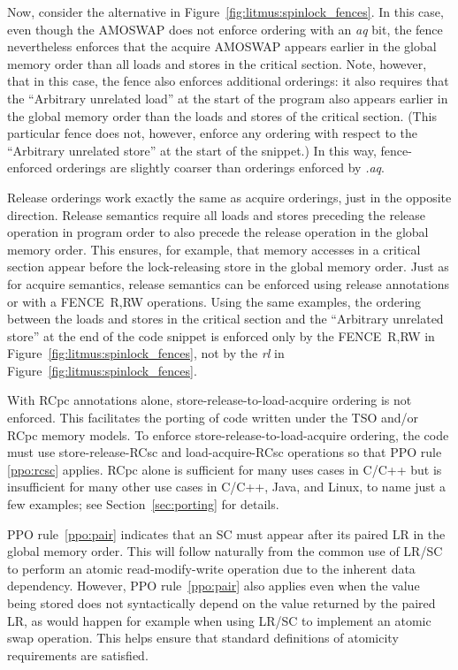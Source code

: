 Now, consider the alternative in Figure~\ref{fig:litmus:spinlock_fences}.
In this case, even though the AMOSWAP does not enforce ordering with an {\em aq} bit, the fence nevertheless enforces that the acquire AMOSWAP appears earlier in the global memory order than all loads and stores in the critical section.
Note, however, that in this case, the fence also enforces additional orderings: it also requires that the ``Arbitrary unrelated load'' at the start of the program also appears earlier in the global memory order than the loads and stores of the critical section.  (This particular fence does not, however, enforce any ordering with respect to the ``Arbitrary unrelated store'' at the start of the snippet.)
In this way, fence-enforced orderings are slightly coarser than orderings enforced by {\em .aq}.

Release orderings work exactly the same as acquire orderings, just in the opposite direction.  Release semantics require all loads and stores preceding the release operation in program order to also precede the release operation in the global memory order.
This ensures, for example, that memory accesses in a critical section appear before the lock-releasing store in the global memory order.  Just as for acquire semantics, release semantics can be enforced using release annotations or with a FENCE~R,RW operations.  Using the same examples, the ordering between the loads and stores in the critical section and the ``Arbitrary unrelated store'' at the end of the code snippet is enforced only by the FENCE~R,RW in Figure~\ref{fig:litmus:spinlock_fences}, not by the {\em rl} in Figure~\ref{fig:litmus:spinlock_fences}.

With RCpc annotations alone, store-release-to-load-acquire ordering is not enforced.  This facilitates the porting of code written under the TSO and/or RCpc memory models.  
To enforce store-release-to-load-acquire ordering, the code must use store-release-RCsc and load-acquire-RCsc operations so that PPO rule \ref{ppo:rcsc} applies.
RCpc alone is sufficient for many uses cases in C/C++ but is insufficient for many other use cases in C/C++, Java, and Linux, to name just a few examples; see Section~\ref{sec:porting} for details.

PPO rule~\ref{ppo:pair} indicates that an SC must appear after its paired LR in the global memory order.
This will follow naturally from the common use of LR/SC to perform an atomic read-modify-write operation due to the inherent data dependency.
However, PPO rule~\ref{ppo:pair} also applies even when the value being stored does not syntactically depend on the value returned by the paired LR, as would happen for example when using LR/SC to implement an atomic swap operation.
This helps ensure that standard definitions of atomicity requirements are satisfied.

